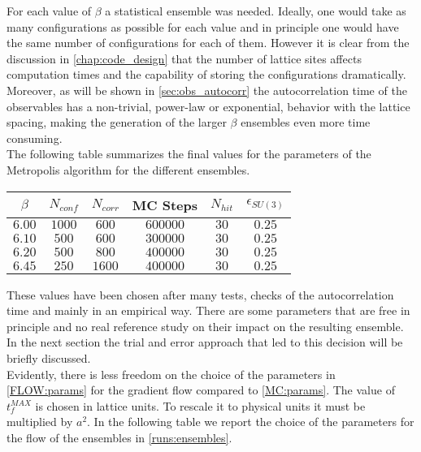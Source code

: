 For each value of $\beta$ a statistical ensemble was needed. Ideally, one would take as many configurations as possible for each value and in principle one would have the same number of configurations for each of them. However it is clear from the discussion in \cref{chap:code_design} that the number of lattice sites affects computation times and the capability of storing the configurations dramatically. Moreover, as will be shown in \cref{sec:obs_autocorr} the autocorrelation time of the observables has a non-trivial, power-law or exponential, behavior with the lattice spacing, making the generation of the larger $\beta$ ensembles even more time consuming.\\
The following table summarizes the final values for the parameters of the Metropolis algorithm for the different ensembles.
\begin{table}[!htb]
    \begin{center}
    \begin{tabular}{cccccc}
        $\beta$ & $N_{conf}$ & $N_{corr}$ & MC Steps & $N_{hit}$ & $\epsilon_{SU(3)}$\\\hline
        $6.00$ & $1000$ & $600$ & $600000$ & $30$ & $0.25$\\
        $6.10$ & $500$ & $600$ & $300000$ & $30$ & $0.25$\\
        $6.20$ & $500$ & $800$ & $400000$ & $30$ & $0.25$\\
        $6.45$ & $250$ & $1600$ & $400000$ & $30$ & $0.25$
    \end{tabular}
    \label{runs:mcparams} 
    \end{center}
\end{table}
These values have been chosen after many tests, checks of the autocorrelation time and mainly in an empirical way. There are some parameters that are free in principle and no real reference study on their impact on the resulting ensemble. In the next section the trial and error approach that led to this decision will be briefly discussed.\\
Evidently, there is less freedom on the choice of the parameters in \cref{FLOW:params} for the gradient flow compared to \cref{MC:params}. The value of $t_f^{MAX}$ is chosen in lattice units. To rescale it to physical units it must be multiplied by $a^2$. In the following table we report the choice of the parameters for the flow of the ensembles in \cref{runs:ensembles}.

